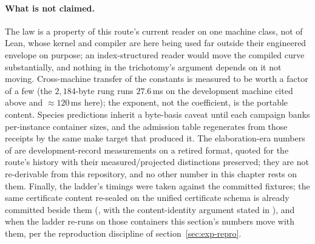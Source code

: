\paragraph{What is not claimed.} The law is a property of this route's
current reader on one machine class, not of Lean, whose kernel and
compiler are here being used far outside their engineered envelope on
purpose; an index-structured reader would move the compiled curve
substantially, and nothing in the trichotomy's argument depends on it
not moving. Cross-machine transfer of the constants is measured to be
worth a factor of a few (the $2{,}184$-byte rung runs $27.6$\,ms on the
development machine cited above and $\approx 120$\,ms here); the
exponent, not the coefficient, is the portable content. Species
predictions inherit a byte-basis caveat until each campaign banks
per-instance container sizes, and the admission table regenerates from
those receipts by the same make target that produced it. The
elaboration-era numbers of  are
development-record measurements on a retired format, quoted for the
route's history with their measured/projected distinctions preserved;
they are not re-derivable from this repository, and no other number in
this chapter rests on them. Finally, the ladder's timings were taken
against the committed fixtures; the same certificate content
re-sealed on the unified certificate schema is already committed
beside them (, with the
content-identity argument stated in ),
and when the ladder re-runs on those containers this section's
numbers move with them, per the reproduction discipline of
section~\ref{sec:exp-repro}.
